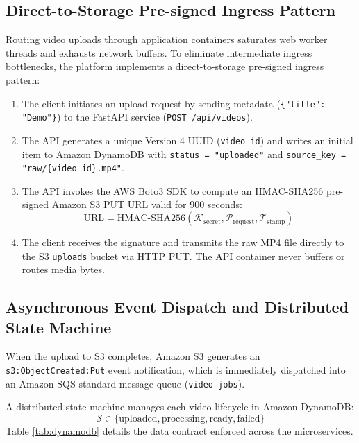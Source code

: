 \documentclass[conference]{IEEEtran}
\begin{document}
\subsection{Direct-to-Storage Pre-signed Ingress Pattern}
Routing video uploads through application containers saturates web worker threads and exhausts network buffers. To eliminate intermediate ingress bottlenecks, the platform implements a direct-to-storage pre-signed ingress pattern:
\begin{enumerate}
    \item The client initiates an upload request by sending metadata (\texttt{\{"title": "Demo"\}}) to the FastAPI service (\texttt{POST /api/videos}).
    \item The API generates a unique Version 4 UUID (\texttt{video\_id}) and writes an initial item to Amazon DynamoDB with \texttt{status = "uploaded"} and \texttt{source\_key = "raw/\{video\_id\}.mp4"}.
    \item The API invokes the AWS Boto3 SDK to compute an HMAC-SHA256 pre-signed Amazon S3 PUT URL valid for 900 seconds:
    \begin{equation}
        \text{URL} = \text{HMAC-SHA256}(\mathcal{K}_{\text{secret}}, \mathcal{P}_{\text{request}}, \mathcal{T}_{\text{stamp}})
    \end{equation}
    \item The client receives the signature and transmits the raw MP4 file directly to the S3 \texttt{uploads} bucket via HTTP PUT. The API container never buffers or routes media bytes.
\end{enumerate}

\subsection{Asynchronous Event Dispatch and Distributed State Machine}
When the upload to S3 completes, Amazon S3 generates an \texttt{s3:ObjectCreated:Put} event notification, which is immediately dispatched into an Amazon SQS standard message queue (\texttt{video-jobs}). 

A distributed state machine manages each video lifecycle in Amazon DynamoDB:
\begin{equation}
    \mathcal{S} \in \{\text{uploaded}, \text{processing}, \text{ready}, \text{failed}\}
\end{equation}
Table \ref{tab:dynamodb} details the data contract enforced across the microservices.
\end{document}
